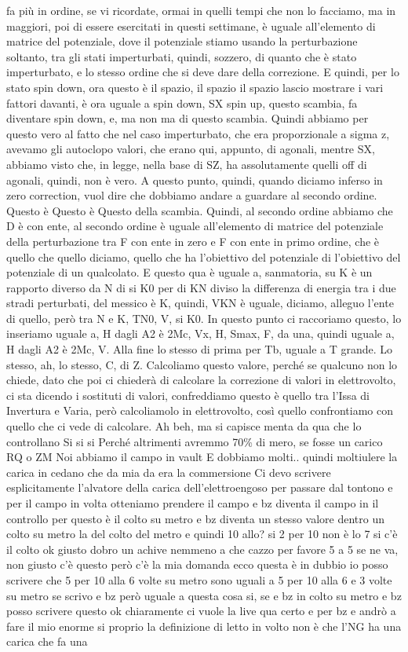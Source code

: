 \begin{soluzione}
   fa più in ordine, se vi ricordate, ormai in quelli tempi che non lo facciamo, ma in maggiori, poi di essere esercitati in questi settimane, è uguale all'elemento di matrice del potenziale, dove il potenziale stiamo usando la perturbazione soltanto, tra gli stati imperturbati, quindi, sozzero, di quanto che è stato imperturbato, e lo stesso ordine che si deve dare della correzione. E quindi, per lo stato spin down, ora questo è il spazio, il spazio il spazio lascio mostrare i vari fattori davanti, è ora uguale a spin down, SX spin up, questo scambia, fa diventare spin down, e, ma non ma di questo scambia. Quindi abbiamo per questo vero al fatto che nel caso imperturbato, che era proporzionale a sigma z, avevamo gli autoclopo valori, che erano qui, appunto, di agonali, mentre SX, abbiamo visto che, in legge, nella base di SZ, ha assolutamente quelli off di agonali, quindi, non è vero. A questo punto, quindi, quando diciamo inferso in zero correction, vuol dire che dobbiamo andare a guardare al secondo ordine. Questo è Questo è Questo della scambia. Quindi, al secondo ordine abbiamo che D è con ente, al secondo ordine è uguale all'elemento di matrice del potenziale della perturbazione tra F con ente in zero e F con ente in primo ordine, che è quello che quello diciamo, quello che ha l'obiettivo del potenziale di l'obiettivo del potenziale di un qualcolato. E questo qua è uguale a, sanmatoria, su K è un rapporto diverso da N di si K0 per di KN diviso la differenza di energia tra i due stradi perturbati, del messico è K, quindi, VKN è uguale, diciamo, alleguo l'ente di quello, però tra N e K, TN0, V, si K0. In questo punto ci raccoriamo questo, lo inseriamo uguale a, H dagli A2 è 2Mc, Vx, H, Smax, F, da una, quindi uguale a, H dagli A2 è 2Mc, V. Alla fine lo stesso di prima per Tb, uguale a T grande. Lo stesso, ah, lo stesso, C, di Z. Calcoliamo questo valore, perché se qualcuno non lo chiede, dato che poi ci chiederà di calcolare la correzione di valori in elettrovolto, ci sta dicendo i sostituti di valori, confreddiamo questo è quello tra l'Issa di Invertura e Varia, però calcoliamolo in elettrovolto, così quello confrontiamo con quello che ci vede di calcolare. Ah beh, ma si capisce menta da qua che lo controllano Si si si Perché altrimenti avremmo 70\% di mero, se fosse un carico RQ o ZM Noi abbiamo il campo in vault E dobbiamo molti.. quindi moltiulere la carica in cedano che da mia da era la commersione Ci devo scrivere esplicitamente l'alvatore della carica dell'elettroengoso per passare dal tontono e per il campo in volta otteniamo prendere il campo e bz diventa il campo in il controllo per questo è il colto su metro e bz diventa un stesso valore dentro un colto su metro la del colto del metro e quindi 10 allo? si 2 per 10 non è lo 7 si c'è il colto ok giusto dobro un achive nemmeno a che cazzo per favore 5 a 5 se ne va, non giusto c'è questo però c'è la mia domanda ecco questa è in dubbio io posso scrivere che 5 per 10 alla 6 volte su metro sono uguali a 5 per 10 alla 6 e 3 volte su metro se scrivo e bz però uguale a questa cosa si, se e bz in colto su metro e bz posso scrivere questo ok chiaramente ci vuole la live qua certo e per bz e andrò a fare il mio enorme si proprio la definizione di letto in volto non è che l'NG ha una carica che fa una 
\end{soluzione}
